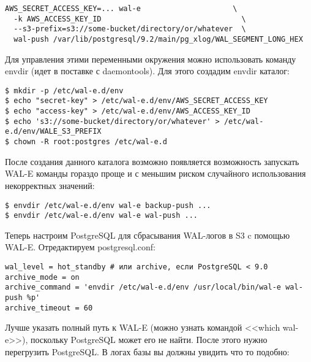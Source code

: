 \begin{lstlisting}[label=lst:wal-e4,caption=Загрузка WAL-логов на S3]
AWS_SECRET_ACCESS_KEY=... wal-e                     \
  -k AWS_ACCESS_KEY_ID                                \
  --s3-prefix=s3://some-bucket/directory/or/whatever  \
  wal-push /var/lib/postgresql/9.2/main/pg_xlog/WAL_SEGMENT_LONG_HEX
\end{lstlisting}

Для управления этими переменными окружения можно использовать команду envdir (идет в поставке с daemontools). Для этого создадим envdir каталог:

\begin{lstlisting}[label=lst:wal-e5,caption=WAL-E с envdir]
$ mkdir -p /etc/wal-e.d/env
$ echo "secret-key" > /etc/wal-e.d/env/AWS_SECRET_ACCESS_KEY
$ echo "access-key" > /etc/wal-e.d/env/AWS_ACCESS_KEY_ID
$ echo 's3://some-bucket/directory/or/whatever' > /etc/wal-e.d/env/WALE_S3_PREFIX
$ chown -R root:postgres /etc/wal-e.d
\end{lstlisting}

После создания данного каталога возможно появляется возможность запускать WAL-E команды гораздо проще и с меньшим риском случайного использования некорректных значений:

\begin{lstlisting}[label=lst:wal-e6,caption=WAL-E с envdir]
$ envdir /etc/wal-e.d/env wal-e backup-push ...
$ envdir /etc/wal-e.d/env wal-e wal-push ...
\end{lstlisting}

Теперь настроим PostgreSQL для сбрасывания WAL-логов в S3 c помощью WAL-E. Отредактируем postgresql.conf:

\begin{lstlisting}[label=lst:wal-e7,caption=Настройка PostgreSQL]
wal_level = hot_standby # или archive, если PostgreSQL < 9.0
archive_mode = on
archive_command = 'envdir /etc/wal-e.d/env /usr/local/bin/wal-e wal-push %p'
archive_timeout = 60
\end{lstlisting}

Лучше указать полный путь к WAL-E (можно узнать командой <<which wal-e>>), поскольку PostgreSQL может его не найти. После этого нужно перегрузить PostgreSQL. В логах базы вы должны увидить что то подобно:

